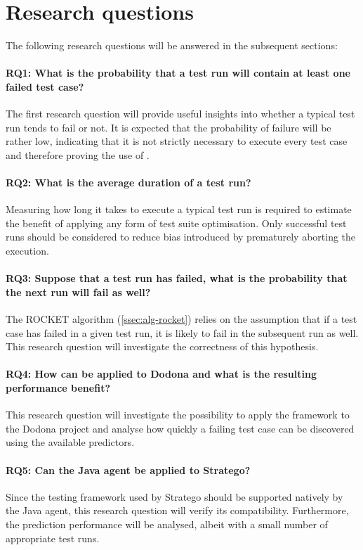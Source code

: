 
\section{Research questions}
The following research questions will be answered in the subsequent sections:

\paragraph*{RQ1: What is the probability that a test run will contain at least one failed test case?}
The first research question will provide useful insights into whether a typical test run tends to fail or not. It is expected that the probability of failure will be rather low, indicating that it is not strictly necessary to execute every test case and therefore proving the use of \tsm{}.

\paragraph*{RQ2: What is the average duration of a test run?}
Measuring how long it takes to execute a typical test run is required to estimate the benefit of applying any form of test suite optimisation. Only successful test runs should be considered to reduce bias introduced by prematurely aborting the execution.

\paragraph*{RQ3: Suppose that a test run has failed, what is the probability that the next run will fail as well?}
The ROCKET algorithm (\cref{ssec:alg-rocket}) relies on the assumption that if a test case has failed in a given test run, it is likely to fail in the subsequent run as well. This research question will investigate the correctness of this hypothesis.

\paragraph*{RQ4: How can \tcp{} be applied to Dodona and what is the resulting performance benefit?}
This research question will investigate the possibility to apply the \velocity{} framework to the Dodona project and analyse how quickly a failing test case can be discovered using the available predictors.

\paragraph*{RQ5: Can the Java agent be applied to Stratego?}
Since the testing framework used by Stratego should be supported natively by the Java agent, this research question will verify its compatibility. Furthermore, the prediction performance will be analysed, albeit with a small number of appropriate test runs.